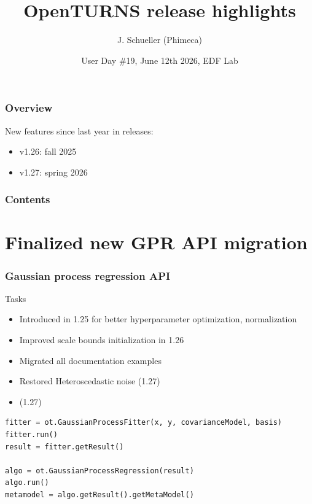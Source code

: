 \documentclass[aspectratio=169]{beamer}
\title[OpenTURNS]{OpenTURNS release highlights}
\author[OpenTURNS et al.]{J. Schueller (Phimeca)}
\date[]{User Day \#19, June 12th 2026, EDF Lab}
\begin{document}

  \begin{frame}
  \titlepage
  \end{frame}

\begin{frame}
\frametitle{Overview}

New features since last year in releases:

\begin{itemize}
\item v1.26: fall 2025
\item v1.27: spring 2026
\end{itemize}

\end{frame}
  

\begin{frame}
\frametitle{Contents}
\tableofcontents
\end{frame}



\section{Finalized new GPR API migration}

\begin{frame}[fragile]
\frametitle{Gaussian process regression API}

\begin{block}{Tasks}
\begin{itemize}
\item Introduced in 1.25 for better hyperparameter optimization, normalization
\item Improved scale bounds initialization in 1.26
\item Migrated all documentation examples
\item Restored Heteroscedastic noise (1.27)
\item  (1.27)
\end{itemize}
\end{block}

\begin{lstlisting}[language=Python]
fitter = ot.GaussianProcessFitter(x, y, covarianceModel, basis)
fitter.run()
result = fitter.getResult()

algo = ot.GaussianProcessRegression(result)
algo.run()
metamodel = algo.getResult().getMetaModel()
\end{lstlisting}

\end{frame}
\end{document}
